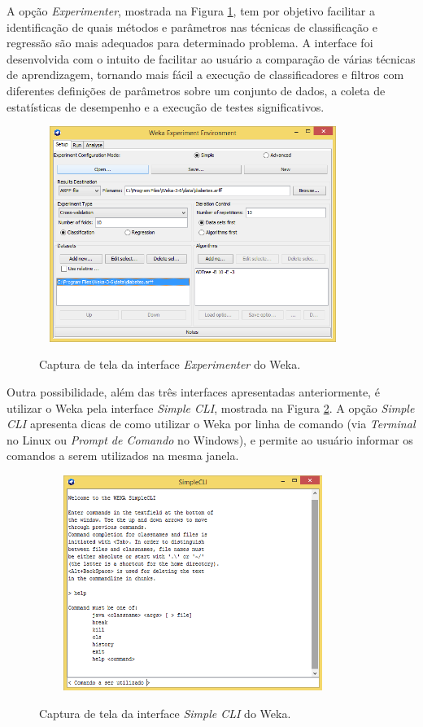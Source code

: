 A opção \textit{Experimenter}, mostrada na Figura \ref{modo3}, tem por objetivo facilitar a identificação de quais métodos e parâmetros nas técnicas de classificação e regressão são mais adequados para determinado problema. A interface foi desenvolvida com o intuito de facilitar ao usuário a comparação de várias técnicas de aprendizagem, tornando mais fácil a execução de classificadores e filtros com diferentes definições de parâmetros sobre um conjunto de dados, a coleta de estatísticas de desempenho e a execução de testes significativos. 

\begin{figure}[!htb]
	\centering
	{\includegraphics[width=10cm,height=7cm]{images/modo3}}
	\caption {Captura de tela da interface \textit{Experimenter} do Weka.}
	\label{modo3}
\end{figure}
 

Outra possibilidade, além das três interfaces apresentadas anteriormente, é utilizar o Weka pela interface \textit{Simple CLI}, mostrada na Figura \ref{modo4}. A opção \textit{Simple CLI} apresenta dicas de como utilizar o Weka por linha de comando (via \textit{Terminal} no Linux ou \textit{Prompt de Comando} no Windows), e permite ao usuário informar os comandos a serem utilizados na mesma janela.

\begin{figure}[!htb]
	\centering
	{\includegraphics[width=10cm,height=7cm]{images/modo4}}
	\caption {Captura de tela da interface \textit{Simple CLI} do Weka.}
	\label{modo4}
\end{figure}
 
